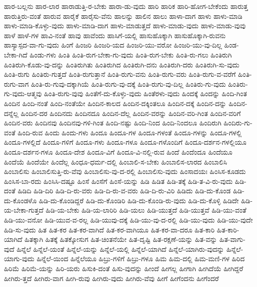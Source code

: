 {ಹಾರ-ಬಲ್ಲನು
ಹಾರ-ಲಾರ
ಹಾರಾಡುತ್ತಿ-ರ-ಬೇಕು
ಹಾರಾ-ಡು-ವುದು
ಹಾರಿ
ಹಾರಿಕ
ಹಾರಿ-ಹೋಗ-ಬೇಕೆಂದು
ಹಾರುತ್ತ
ಹಾರುತ್ತಿರು-ವಂತೆ
ಹಾರುವ
ಹಾರೈಕೆ
ಹಾರೈಸು-ವೆನು
ಹಾಲನ್ನು
ಹಾಲಿನ
ಹಾಲು
ಹಾಳಾ-ದಾಗ
ಹಾಳು
ಹಾಳು-ಮಾಡಿ
ಹಾಳು-ಮಾಡಿ-ಕೊಳ್ಳು-ವುದು
ಹಾಳು-ಮಾಡಿ-ದಾಗ
ಹಾಳು-ಮಾಡುತ್ತದೆ
ಹಾಳು-ಮಾಡು-ವುದು
ಹಾಳು-ಮಾಡು-ವುವು
ಹಾಳೆ
ಹಾಳೆ-ಗಳ
ಹಾವಿ-ನಂತೆ
ಹಾವು
ಹಾವೆಂದು
ಹಾಸಿಗೆ-ಯಲ್ಲಿ
ಹಾಸುಹೊಕ್ಕಾಗಿ
ಹಾಸುಹೊಕ್ಕಾಗಿ-ರುವನು
ಹಾಸ್ಯಾಸ್ಪದ-ವಾ-ಗು-ವುದು
ಹಿಂಗೆ
ಹಿಂಜರಿ
ಹಿಂಜರಿ-ಯದ
ಹಿಂಜರಿ-ಯು-ವರೋ
ಹಿಂಜರಿ-ಯು-ವು-ದಿಲ್ಲ
ಹಿಂಡ-ಬೇಕಾ-ಗಿದೆ
ಹಿಂಡು-ಗಳು
ಹಿಂತಿ
ಹಿಂತಿ-ರುಗ-ಬೇಕಾ-ಗು-ವುದು
ಹಿಂತಿ-ರುಗ-ಬೇಕು
ಹಿಂತಿ-ರು-ಗಲು
ಹಿಂತಿರುಗಿ
ಹಿಂತಿರುಗಿ-ಕೊಡು-ವು-ದನ್ನು
ಹಿಂತಿರುಗಿತು
ಹಿಂತಿರುಗಿದ
ಹಿಂತಿರುಗಿ-ದನು
ಹಿಂತಿರುಗಿ-ದರು
ಹಿಂತಿರುಗಿ-ಸು-ವುದು
ಹಿಂತಿ-ರುಗು
ಹಿಂತಿರು-ಗುತ್ತದೆ
ಹಿಂತಿ-ರುಗುತ್ತಾನೆ
ಹಿಂತಿ-ರುಗು-ವನು
ಹಿಂತಿ-ರುಗು-ವರು
ಹಿಂತಿ-ರುಗು-ವ-ವರೆಗೆ
ಹಿಂತಿ-ರುಗು-ವಾಗ
ಹಿಂತಿ-ರು-ಗುವು-ದಕ್ಕಾಗಿಯೆ
ಹಿಂತಿ-ರುಗು-ವು-ದಕ್ಕೆ
ಹಿಂತಿ-ರುಗು-ವು-ದಿಲ್ಲ
ಹಿಂತಿರು-ಗು-ವುದು
ಹಿಂತಿರು-ಗು-ವುದು-ಆತ್ಮವು
ಹಿಂತಿ-ರುಗು-ವುವು
ಹಿಂತೆಗೆ-ದು-ಕೊಳ್ಳು-ವುದು
ಹಿಂತೆರಳು-ವುದು
ಹಿಂದಕ್ಕೆ
ಹಿಂದನ್ನು
ಹಿಂದಿ-ಗಿಂತ
ಹಿಂದಿನ
ಹಿಂದಿ-ನಂತೆ
ಹಿಂದಿ-ನಂತೆಯೇ
ಹಿಂದಿನ-ಕಾಲದ
ಹಿಂದಿನ-ದಕ್ಕಿಂತಲೂ
ಹಿಂದಿನ-ದಕ್ಕೆ
ಹಿಂದಿನ-ದನ್ನು
ಹಿಂದಿನ-ದನ್ನೆಲ್ಲ
ಹಿಂದಿನ-ದರ
ಹಿಂದಿನದು
ಹಿಂದಿನದೂ
ಹಿಂದಿನ-ದೆಲ್ಲ
ಹಿಂದಿನ-ವರನ್ನು
ಹಿಂದಿನ-ವರಿ-ಗಿಂತ
ಹಿಂದಿನ-ವರಿಗೆ
ಹಿಂದಿನ-ವರು
ಹಿಂದಿನವು
ಹಿಂದಿನವು-ಗಳಿ-ಗಿಂತ
ಹಿಂದಿ-ನಷ್ಟು
ಹಿಂದಿ-ನಿಂದ
ಹಿಂದಿ-ನಿಂದಲೂ
ಹಿಂದಿರುಗಿ
ಹಿಂದಿರು-ಗು-ವಂತೆ
ಹಿಂದಿ-ರುವ
ಹಿಂದು
ಹಿಂದು-ಗಳು
ಹಿಂದೂ
ಹಿಂದೂ-ಗಳ
ಹಿಂದೂ-ಗಳಂತೆ
ಹಿಂದೂ-ಗಳನ್ನು
ಹಿಂದೂ-ಗಳಲ್ಲಿ
ಹಿಂದೂ-ಗಳಲ್ಲಿದೆ
ಹಿಂದೂ-ಗಳಿಗೆ
ಹಿಂದೂ-ಗಳು
ಹಿಂದೂ-ಗಳೂ
ಹಿಂದೂ-ಗಳೊಂದಿಗೆ
ಹಿಂದೂ-ದರ್ಶನ-ಗಳಲ್ಲಿಯೂ
ಹಿಂದೂ-ದರ್ಶನ-ಗಳೂ
ಹಿಂದೂ-ದೇಶ
ಹಿಂದೂ-ವಿಗೆ
ಹಿಂದೂ-ವಿ-ನಲ್ಲಿ-ರುವ
ಹಿಂದೆ
ಹಿಂದೆಂದೂ
ಹಿಂದೆಯೂ
ಹಿಂದೆಯೆ
ಹಿಂದೆಯೇ
ಹಿಂದೆಲ್ಲ
ಹಿಂಧೂ-ಧರ್ಮ-ದಲ್ಲಿ
ಹಿಂಬಾಲಿ-ಸ-ಬೇಕು
ಹಿಂಬಾಲಿಸ-ಲಾರದ
ಹಿಂಬಾಲಿಸಿ
ಹಿಂಬಾಲಿಸು
ಹಿಂಬಾಲಿಸುತ್ತಿ-ರು-ವೆವು
ಹಿಂಬಾಲಿಸು-ವು-ದ-ರಲ್ಲಿ
ಹಿಂಬಾಲಿಸು-ವುದು
ಹಿಂಸಾದಯಃ
ಹಿಂಸಿಸ-ಕೂಡದು
ಹಿಂಸಿಸ-ಬಾ-ರದು
ಹಿಂಸಿಸಿ-ದಷ್ಟೂ
ಹಿಂಸೆ
ಹಿಂಸೆಗೆ
ಹಿಂಸೆ-ಯನ್ನು
ಹಿಡಿ
ಹಿಡಿತ
ಹಿಡಿ-ತಕ್ಕೆ
ಹಿಡಿ-ತ-ವಿ-ರು-ವುದು
ಹಿಡಿ-ದಂತೆ
ಹಿಡಿದಿ
ಹಿಡಿ-ದಿರಿ
ಹಿಡಿ-ದಿ-ರು-ವರು
ಹಿಡಿ-ದಿ-ರು-ವ-ವರು
ಹಿಡಿ-ದಿ-ರು-ವಿರಿ
ಹಿಡಿದು
ಹಿಡಿ-ದು-ಕೊಂಡ
ಹಿಡಿ-ದು-ಕೊಂಡಳೊ
ಹಿಡಿ-ದು-ಕೊಂಡಿದ್ದರೆ
ಹಿಡಿ-ದು-ಕೊಂಡಿರಿ
ಹಿಡಿ-ದು-ಕೊಂಡಿ-ರು-ವುದು
ಹಿಡಿ-ದು-ಕೊಳ್ಳಿ
ಹಿಡಿದೇ
ಹಿಡಿ-ಯ-ಬೇಕಾ-ಗುತ್ತದೆ
ಹಿಡಿ-ಯ-ಬೇಕು
ಹಿಡಿ-ಯ-ಲಾರಿರಿ
ಹಿಡಿ-ಯಲು
ಹಿಡಿ-ಯುತ್ತದೆ
ಹಿಡಿ-ಯುತ್ತವೆ
ಹಿಡಿ-ಯು-ವಂತೆ
ಹಿಡಿ-ಯು-ವನೋ
ಹಿಡಿ-ಯುವ-ವ-ರಲ್ಲ
ಹಿಡಿ-ಯುವು-ದಕ್ಕೆ
ಹಿಡಿ-ಯು-ವು-ದ-ರಲ್ಲಿ
ಹಿಡಿ-ಯು-ವುದು
ಹಿಡಿ-ಯು-ವುದೇ
ಹಿಡಿ-ಸು-ವುದು
ಹಿತ
ಹಿತ-ಕರ
ಹಿತ-ಕರ-ವಾಗಿದೆ
ಹಿತ-ಕರ-ವಾಗಿಯೂ
ಹಿತ-ಕರ-ವಾ-ದರೂ
ಹಿತ-ಕಾರಿ
ಹಿತ-ಕಾರಿ-ಯಾಗಿದೆ
ಹಿತಕ್ಕಾಗಿ
ಹಿತಕ್ಕೆ
ಹಿತಕ್ಕೋಸುಗ
ಹಿತ-ಚಿಂತನೆಯೇ
ಹಿತ-ದೃಷ್ಟಿ
ಹಿತ-ರಕ್ಷಣೆ-ಯನ್ನು
ಹಿತ-ವನ್ನು
ಹಿತ-ವಾಗು-ವುದೆ
ಹಿನ್ನೆಲೆ
ಹಿನ್ನೆಲೆ-ಯಂತೆ
ಹಿನ್ನೆಲೆ-ಯನ್ನು
ಹಿನ್ನೆಲೆ-ಯಲ್ಲಿ
ಹಿನ್ನೆಲೆ-ಯಾಗಿದೆ
ಹಿನ್ನೆಲೆ-ಯಾಗಿರು-ವುದನ್ನು
ಹಿನ್ನೆಲೆ-ಯಾಗು-ವುದು
ಹಿನ್ನೆಲೆ-ಯಿಂದ
ಹಿನ್ನೆಲೆಯೂ
ಹಿಬ್ರು-ಗಳಿಗೆ
ಹಿಬ್ರು-ಗಳೂ
ಹಿಮ
ಹಿಮ-ದಲ್ಲಿ
ಹಿಮ-ಮಣಿ-ಗಳ
ಹಿರಿದ
ಹಿರಿಮೆ
ಹಿರಿಮೆ-ಯನ್ನು
ಹಿರಿ-ಯರು
ಹಿಸುಕಿ-ದಂತೆ
ಹಿಸು-ವುದನ್ನು
ಹೀಂದೆ
ಹೀಗಲ್ಲ
ಹೀಗಾಗಿ
ಹೀಗಿದೆಯೆ
ಹೀಗಿದ್ದರೆ
ಹೀಗಿರು-ತ್ತದೆ
ಹೀಗಿರು-ವಾಗ
ಹೀಗಿ-ರುವು
ಹೀಗಿರು-ವುದು
ಹೀಗಿರು-ವೆವು
ಹೀಗೆ
ಹೀಗೆಂದನು
ಹೀಗೆಂದರೆ
}
